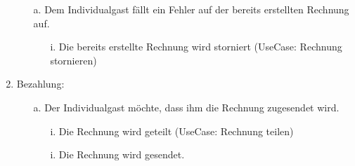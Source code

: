 \documentclass[./detailed_overview_usecases.tex]{subfiles}
\begin{document}
\begin{enumerate}
        \begin{itemize}
            \item[a.] Dem Individualgast fällt ein Fehler auf der bereits erstellten Rechnung auf.
            \begin{itemize}
                \item[i.] Die bereits erstellte Rechnung wird storniert (UseCase: Rechnung stornieren)
            \end{itemize}
        \end{itemize}
        \setcounter{enumi}{5}
        \item Bezahlung: \begin{itemize}
                             \item[a.] Der Individualgast möchte, dass ihm die Rechnung zugesendet wird.
                             \begin{itemize}
                                 \item[i.] Die Rechnung wird geteilt (UseCase: Rechnung teilen)
                                 \item[i.] Die Rechnung wird gesendet.
                             \end{itemize}
        \end{itemize}
    \end{enumerate}
\end{document}
